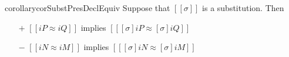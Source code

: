 \begin{restatable}{corollary}{corSubstPresDeclEquiv}
    \label{corollary:subst-pres-decl-equiv}
    Suppose that $[[σ]]$ is a substitution. Then
        \begin{itemize}
            \item[$+$] $[[iP ≈ iQ]]$ implies $[[ [σ]iP ≈ [σ]iQ ]]$
            \item[$-$] $[[iN ≈ iM]]$ implies $[[ [σ]iN ≈ [σ]iM ]]$
        \end{itemize}
\end{restatable}


